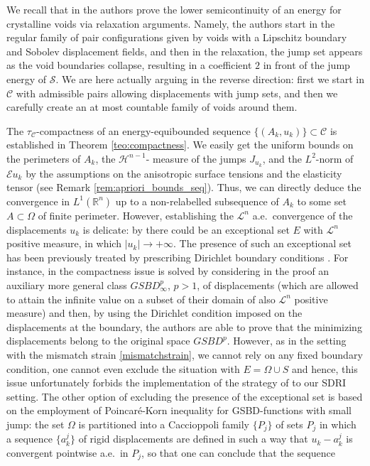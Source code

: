 \documentclass[reqno]{amsart}
\numberwithin{equation}{section}
\theoremstyle{plain}
\theoremstyle{definition}
\newcommand{\R}{\mathbb{R}}
\newcommand{\cH}{\mathcal{H}}
\newcommand{\cS}{\mathcal{S}}
\newcommand{\str}[1]{\mathcal{E}#1}
\newcommand{\admissible}{\mathcal{C}}
\begin{document}
%
We recall that in \cite{CF:2020_arma} the authors prove the lower semicontinuity of an energy for crystalline voids via relaxation arguments. Namely, the authors start in the regular family of pair configurations given by voids with a Lipschitz boundary and Sobolev displacement fields, and then in the relaxation, the jump set appears as the void boundaries collapse, resulting in a coefficient $2$ in front of the jump energy of $\cS$. We are here actually arguing in the reverse direction:  first we start in $\mathcal{C}$ with admissible pairs allowing displacements with jump sets, and then we carefully create an at most countable family of voids around them.



The $\tau_\admissible$-compactness of an energy-equibounded sequence $\{(A_k,u_k)\}\subset \admissible$ is established in Theorem \ref{teo:compactness}. We easily get the uniform bounds on the perimeters of $A_k$, the $\cH^{n-1}$- measure of the jumps $J_{u_k}$, and the $L^2$-norm of $\str{u_k}$ by the assumptions on the  anisotropic surface tensions and the elasticity tensor (see Remark \ref{rem:apriori_bounds_seq}). Thus, we can directly deduce the convergence in $L^1(\R^n)$ up to a non-relabelled subsequence of $A_k$ to some set $A\subset\Omega$ of finite perimeter. However,  establishing the $\mathcal{L}^n$ a.e.\ convergence of the displacements $u_k$ is delicate: by \cite[Theorem 1.1]{ChC:2020_jems} there could be an exceptional set $E$ with $\mathcal{L}^n$ positive measure, in which $|u_k|\to+\infty$. The presence of such an exceptional set has been  previously treated by prescribing Dirichlet boundary conditions  \cite{ChC:2019_arxiv,ChC:2020_jems, CF:2020_arma}. For instance, in \cite{CF:2020_arma} the compactness issue is solved by considering in the proof an auxiliary  more general class $GSBD_\infty^p$, $p>1$, of displacements (which are allowed to attain the infinite value on a subset of their domain of also $\mathcal{L}^n$ positive measure) and then, by using the  Dirichlet condition imposed on the displacements at the boundary, the authors are able to prove that the minimizing displacements belong to the original space $GSBD^p.$ However, as in the setting with the mismatch strain \eqref{mismatchstrain}, we cannot rely on any  fixed  boundary condition, one cannot  even exclude the situation with $E=\Omega\cup S$   and hence, this issue unfortunately forbids the implementation of the strategy of \cite{CF:2020_arma} to our SDRI setting. The other option of excluding the presence of the exceptional set is based on the employment of Poincar\'e-Korn inequality for GSBD-functions \cite{CCF:2016} with small jump: the set $\Omega$ is partitioned into a Caccioppoli family $\{P_j\}$ of sets $P_j$ in which a sequence $\{a_k^j\}$ of rigid displacements are defined in such a way that $u_k - a_k^j$ is convergent pointwise a.e.\ in $P_j$, so that one can conclude that  the sequence
\end{document}
